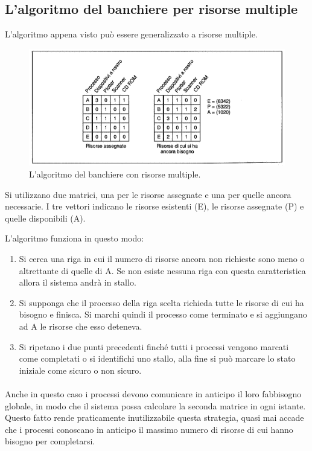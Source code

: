 \subsection{L'algoritmo del banchiere per risorse multiple}
L'algoritmo appena visto può essere generalizzato a risorse multiple.

\begin{figure}[H]
    \centering
    \includegraphics[width=0.6\linewidth]{assets/banchieremultiple9.png}
    \caption{L'algoritmo del banchiere con risorse multiple.}
\end{figure}

Si utilizzano due matrici, una per le risorse assegnate e una per quelle ancora necessarie. I tre vettori indicano le risorse esistenti (E), le risorse assegnate (P) e quelle disponibili (A).

L'algoritmo funziona in questo modo:
\begin{enumerate}
    \item Si cerca una riga in cui il numero di risorse ancora non richieste sono meno o altrettante di quelle di A. Se non esiste nessuna riga con questa caratteristica allora il sistema andrà in stallo.
    \item Si supponga che il processo della riga scelta richieda tutte le risorse di cui ha bisogno e finisca. Si marchi quindi il processo come terminato e si aggiungano ad A le risorse che esso deteneva.
    \item Si ripetano i due punti precedenti finché tutti i processi vengono marcati come completati o si identifichi uno stallo, alla fine si può marcare lo stato iniziale come sicuro o non sicuro.
\end{enumerate}

\paragraph*{}
Anche in questo caso i processi devono comunicare in anticipo il loro fabbisogno globale, in modo che il sistema possa calcolare la seconda matrice in ogni istante. Questo fatto rende praticamente inutilizzabile questa strategia, quasi mai accade che i processi conoscano in anticipo il massimo numero di risorse di cui hanno bisogno per completarsi.


